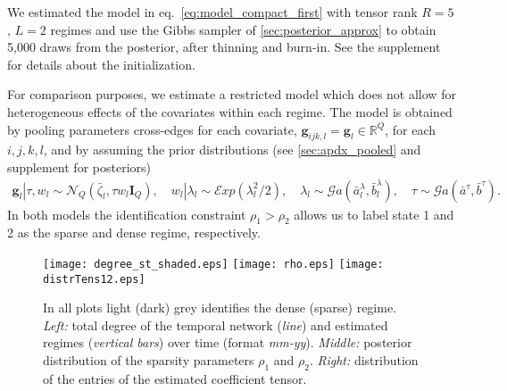 \documentclass[12pt,a4paper]{article}
\def \R{\mathds{R}}
\theoremstyle{custom}
\begin{document}
We estimated the model in eq.~\eqref{eq:model_compact_first} with tensor rank $R=5$, $L=2$ regimes and use the Gibbs sampler of \autoref{sec:posterior_approx} to obtain 5,000 draws from the posterior, after thinning and burn-in.
See the supplement for details about the initialization.

For comparison purposes, we estimate a restricted model which does not allow for heterogeneous effects of the covariates within each regime. The model is obtained by pooling parameters cross-edges for each covariate, $\mathbf{g}_{ijk,l} = \mathbf{g}_l \in \R^Q$, for each $i,j,k,l$, and by assuming the prior distributions (see \autoref{sec:apdx_pooled} and supplement for posteriors)
\begin{align*}
\mathbf{g}_l | \tau,w_l \sim \mathcal{N}_Q(\bar{\zeta}_l,\tau w_l \mathbf{I}_Q), \quad w_l|\lambda_l \sim \mathcal{E}xp(\lambda_l^2/2), \quad \lambda_l \sim \mathcal{G}a(\bar{a}_l^\lambda,\bar{b}_l^\lambda), \quad \tau \sim \mathcal{G}a(\bar{a}^\tau,\bar{b}^\tau).
\end{align*}
In both models the identification constraint $\rho_1 > \rho_2$ allows us to label state 1 and 2 as the sparse and dense regime, respectively.

\begin{figure}[t!h]
\setlength{\abovecaptionskip}{-1pt}
\centering %
\texttt{[image: degree\_st\_shaded.eps]}
\texttt{[image: rho.eps]}
\texttt{[image: distrTens12.eps]}
\caption{In all plots light (dark) grey identifies the dense (sparse) regime. \textit{Left:} total degree of the temporal network (\textit{line}) and estimated regimes (\textit{vertical bars}) over time (format \textit{mm-yy}).  \textit{Middle:} posterior distribution of the sparsity parameters $\rho_1$ and $\rho_2$. \textit{Right:} distribution of the entries of the estimated coefficient tensor.}
\label{fig:degree_states}
\end{figure}
\end{document}

